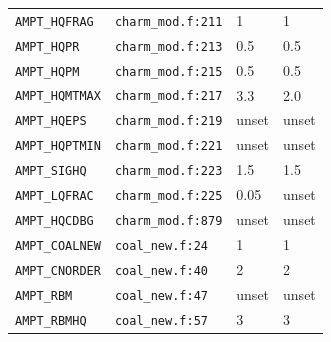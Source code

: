 {\begin{longtable}{@{}p{4.2cm}p{3.4cm}p{2.8cm}p{2.8cm}@{}}
\texttt{AMPT\_\allowbreak{}HQFRAG} & \texttt{charm\_\allowbreak{}mod.f:211} & 1 & 1 \\
\texttt{AMPT\_\allowbreak{}HQPR} & \texttt{charm\_\allowbreak{}mod.f:213} & 0.5 & 0.5 \\
\texttt{AMPT\_\allowbreak{}HQPM} & \texttt{charm\_\allowbreak{}mod.f:215} & 0.5 & 0.5 \\
\texttt{AMPT\_\allowbreak{}HQMTMAX} & \texttt{charm\_\allowbreak{}mod.f:217} & 3.3 & 2.0 \\
\texttt{AMPT\_\allowbreak{}HQEPS} & \texttt{charm\_\allowbreak{}mod.f:219} & unset & unset \\
\texttt{AMPT\_\allowbreak{}HQPTMIN} & \texttt{charm\_\allowbreak{}mod.f:221} & unset & unset \\
\texttt{AMPT\_\allowbreak{}SIGHQ} & \texttt{charm\_\allowbreak{}mod.f:223} & 1.5 & 1.5 \\
\texttt{AMPT\_\allowbreak{}LQFRAC} & \texttt{charm\_\allowbreak{}mod.f:225} & 0.05 & unset \\
\texttt{AMPT\_\allowbreak{}HQCDBG} & \texttt{charm\_\allowbreak{}mod.f:879} & unset & unset \\
\texttt{AMPT\_\allowbreak{}COALNEW} & \texttt{coal\_\allowbreak{}new.f:24} & 1 & 1 \\
\texttt{AMPT\_\allowbreak{}CNORDER} & \texttt{coal\_\allowbreak{}new.f:40} & 2 & 2 \\
\texttt{AMPT\_\allowbreak{}RBM} & \texttt{coal\_\allowbreak{}new.f:47} & unset & unset \\
\texttt{AMPT\_\allowbreak{}RBMHQ} & \texttt{coal\_\allowbreak{}new.f:57} & 3 & 3 \\
\bottomrule \end{longtable}}
